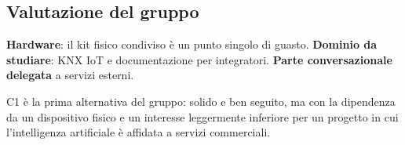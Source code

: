 \subsection{Valutazione del gruppo}

\begin{fortedeboli}
     {\textbf{Hardware}: il kit fisico condiviso è un punto singolo di
      guasto.}
     {\textbf{Dominio da studiare}: KNX IoT e documentazione per
      integratori.}
     {\textbf{Parte conversazionale delegata} a servizi esterni.}
\end{fortedeboli}

C1 è la prima alternativa del gruppo: solido e ben seguito, ma con la
dipendenza da un dispositivo fisico e un interesse leggermente inferiore
per un progetto in cui l'intelligenza artificiale è affidata a servizi
commerciali.
